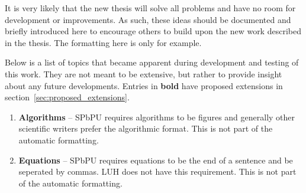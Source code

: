 \label{sec:topic_points}
It is very likely that the new thesis will solve all problems and have no room for development or improvements. As such, these ideas should be documented and briefly introduced here to encourage others to build upon the new work described in the thesis. The formatting here is only for example.

Below is a list of topics that became apparent during development and testing of this work. They are not meant to be extensive, but rather to provide insight about any future developments. Entries in \textbf{bold} have proposed extensions in section~\ref{sec:proposed_extensions}.

\begin{enumerate}
    \item \textbf{Algorithms} – SPbPU requires algorithms to be figures and generally other scientific writers prefer the algorithmic format. This is not part of the automatic formatting.
    \item \textbf{Equations} – SPbPU requires equations to be the end of a sentence and be seperated by commas. LUH does not have this requirement. This is not part of the automatic formatting.
\end{enumerate}
